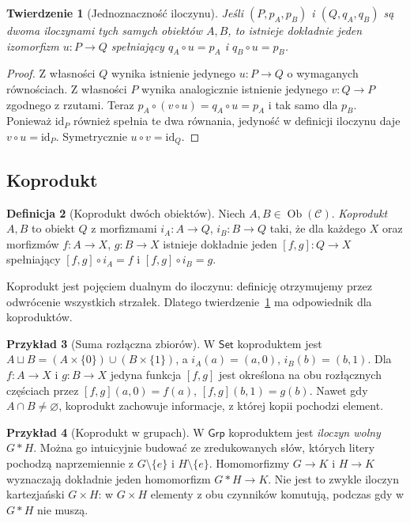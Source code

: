 \documentclass[11pt,a4paper]{article}
\numberwithin{equation}{section}
\theoremstyle{plain}
\newtheorem{twierdzenie}{Twierdzenie}[section]
\theoremstyle{definition}
\newtheorem{definicja}[twierdzenie]{Definicja}
\newtheorem{przyklad}[twierdzenie]{Przykład}
\theoremstyle{remark}
\newcommand{\cat}[1]{\mathsf{#1}}
\newcommand{\Set}{\cat{Set}}
\newcommand{\Grp}{\cat{Grp}}
\newcommand{\id}{\mathrm{id}}
\newcommand{\Ob}{\operatorname{Ob}}
\begin{document}
\begin{twierdzenie}[Jednoznaczność iloczynu]\label{tw:produkt-unique}
Jeśli $(P,p_A,p_B)$ i $(Q,q_A,q_B)$ są dwoma iloczynami tych samych obiektów $A,B$, to istnieje dokładnie jeden izomorfizm $u:P\to Q$ spełniający $q_A\circ u=p_A$ i $q_B\circ u=p_B$.
\end{twierdzenie}
\begin{proof}
Z własności $Q$ wynika istnienie jedynego $u:P\to Q$ o wymaganych równościach. Z własności $P$ wynika analogicznie istnienie jedynego $v:Q\to P$ zgodnego z rzutami. Teraz $p_A\circ(v\circ u)=q_A\circ u=p_A$ i tak samo dla $p_B$. Ponieważ $\id_P$ również spełnia te dwa równania, jedyność w definicji iloczynu daje $v\circ u=\id_P$. Symetrycznie $u\circ v=\id_Q$.
\end{proof}

\subsection{Koprodukt}

\begin{definicja}[Koprodukt dwóch obiektów]\label{def:koprodukt}
Niech $A,B\in\Ob(\mathcal C)$. \emph{Koprodukt} $A,B$ to obiekt $Q$ z morfizmami $i_A:A\to Q$, $i_B:B\to Q$ taki, że dla każdego $X$ oraz morfizmów $f:A\to X$, $g:B\to X$ istnieje dokładnie jeden $[f,g]:Q\to X$ spełniający $[f,g]\circ i_A=f$ i $[f,g]\circ i_B=g$.
\end{definicja}

Koprodukt jest pojęciem dualnym do iloczynu: definicję otrzymujemy przez odwrócenie wszystkich strzałek. Dlatego twierdzenie~\ref{tw:produkt-unique} ma odpowiednik dla koproduktów.

\begin{przyklad}[Suma rozłączna zbiorów]
W $\Set$ koproduktem jest $A\sqcup B=(A\times\{0\})\cup(B\times\{1\})$, a $i_A(a)=(a,0)$, $i_B(b)=(b,1)$. Dla $f:A\to X$ i $g:B\to X$ jedyna funkcja $[f,g]$ jest określona na obu rozłącznych częściach przez $[f,g](a,0)=f(a)$, $[f,g](b,1)=g(b)$. Nawet gdy $A\cap B\neq\varnothing$, koprodukt zachowuje informacje, z której kopii pochodzi element.
\end{przyklad}

\begin{przyklad}[Koprodukt w grupach]
W $\Grp$ koproduktem jest \emph{iloczyn wolny} $G*H$. Można go intuicyjnie budować ze zredukowanych słów, których litery pochodzą naprzemiennie z $G\setminus\{e\}$ i $H\setminus\{e\}$. Homomorfizmy $G\to K$ i $H\to K$ wyznaczają dokładnie jeden homomorfizm $G*H\to K$. Nie jest to zwykle iloczyn kartezjański $G\times H$: w $G\times H$ elementy z obu czynników komutują, podczas gdy w $G*H$ nie muszą.
\end{przyklad}
\end{document}
